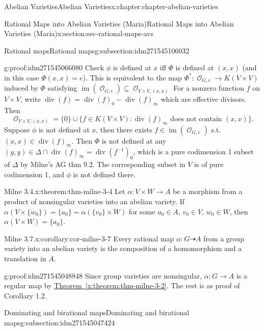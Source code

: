 \documentclass[oneside,10pt,]{book}
\numberwithin{equation}{section}
\newcommand{\sheaf}[1]{\operatorname{\mathcal{#1}}}
\DeclareMathOperator{\divisor}{div}
\DeclareMathOperator{\im}{im}
\begin{document}
\begin{chapterptx}{Abelian Varieties}{}{Abelian Varieties}{}{}{x:chapter:chapter-abelian-varieties}
\begin{sectionptx}{Rational Maps into Abelian Varieties (Maria)}{}{Rational Maps into Abelian Varieties (Maria)}{}{}{x:section:sec-rational-maps-avs}
\begin{subsectionptx}{Rational maps}{}{Rational maps}{}{}{g:subsection:idm271545106032}
\begin{proofptx}{}{g:proof:idm271545066080}
Check \(\phi\) is defined at \(x\) iff \(\Phi\) is defined at \((x,x)\) (and in this case \(\Phi(x,x) = e\)). This is equivalent to the map \(\Phi^*\colon \sheaf O_{G,e} \to K(V\times V)\) induced by  \(\Phi\) satisfying   \(\im(\sheaf O_{G,e}) \subseteq \sheaf O_{V\times V, (x,x)}\) For a nonzero function \(f\) on \(V\times V\), write \(\divisor(f) = \divisor(f)_0 - \divisor(f)_\infty\) which are effective divisors. Then%
\begin{equation*}
\sheaf O_{V\times V, (x,x)} = \{0\} \cup \{f\in K(V\times V) : \divisor(f)_\infty \text{ does not contain }(x,x)\}\text{.}
\end{equation*}
Suppose \(\phi\) is not defined at \(x\), then there exists \(f\in \im(\sheaf O_{G,e})\) s.t. \((x,x) \in \divisor(f)_\infty\). Then \(\Phi\) is not defined at any \((y,y) \in \Delta \cap  \divisor(f)_\infty = \divisor(f^{-1})_0\), which is a pure codimension 1 subset of \(\Delta\) by Milne's AG thm 9.2. The corresponding subset in \(V\) is of pure codimension 1, and \(\phi\) is not defined there.%
\end{proofptx}
\begin{theorem}{Milne 3.4.}{}{x:theorem:thm-milne-3-4}%
Let \(\alpha \colon V \times W \to A\) be a morphism from a product of nonsingular varieties into an abelian variety. If \(\alpha (V\times\{w_0\}) = \{a_0 \} =  \alpha(\{v_0 \}\times W)\) for some \(a_0 \in A\), \(v_0\in V\), \(w_0 \in W\), then \(\alpha(V\times W) = \{a_0\}\).%
\end{theorem}
\begin{corollary}{Milne 3.7.}{}{x:corollary:cor-milne-3-7}%
Every rational map \(\alpha \colon G\dashrightarrow A\) from a group variety into an abelian variety is the composition of a homomorphism and a translation in \(A\).%
\end{corollary}
\begin{proofptx}{}{g:proof:idm271545048848}
Since group varieties are nonsingular, \(\alpha\colon G \to A\) is a regular map by \hyperref[x:theorem:thm-milne-3-2]{Theorem~\ref{x:theorem:thm-milne-3-2}}. The rest is as proof of Corollary 1.2.%
\end{proofptx}
\end{subsectionptx}
%
%
\typeout{************************************************}
\typeout{************************************************}
%
\begin{subsectionptx}{Dominating and birational maps}{}{Dominating and birational maps}{}{}{g:subsection:idm271545047424}

\end{subsectionptx}
\end{sectionptx}
\end{chapterptx}
\end{document}
